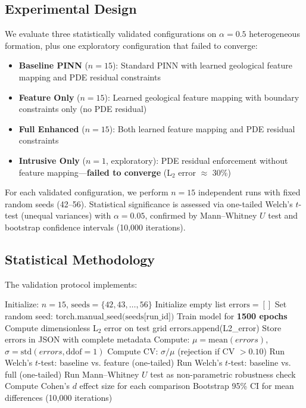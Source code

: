 \documentclass[sn-mathphys]{sn-jnl}
\begin{document}
	\subsection{Experimental Design}
	We evaluate three statistically validated configurations on $\alpha=0.5$ heterogeneous formation, plus one exploratory configuration that failed to converge:
	
	\begin{itemize}
		\item \textbf{Baseline PINN} ($n=15$): Standard PINN with learned geological feature mapping and PDE residual constraints
		\item \textbf{Feature Only} ($n=15$): Learned geological feature mapping with boundary constraints only (no PDE residual)
		\item \textbf{Full Enhanced} ($n=15$): Both learned feature mapping and PDE residual constraints
		\item \textbf{Intrusive Only} ($n=1$, exploratory): PDE residual enforcement without feature mapping---\textbf{failed to converge} (L$_2$ error $\approx$ 30\%)
	\end{itemize}
	
	For each validated configuration, we perform $n=15$ independent runs with fixed random seeds (42--56). Statistical significance is assessed via one-tailed Welch's $t$-test (unequal variances) with $\alpha=0.05$, confirmed by Mann--Whitney $U$ test and bootstrap confidence intervals (10,000 iterations).
	
	\subsection{Statistical Methodology}
	The validation protocol implements:
	
	\begin{algorithm}[htbp]
		\caption{Statistical Validation Protocol}
		\begin{algorithmic}[1]
			\State Initialize: $n=15$, $\text{seeds} = \{42, 43, \ldots, 56\}$
			  
			\State Initialize empty list $\text{errors} = []$
			\State Set random seed: $\text{torch.manual\_seed(seeds[run\_id])}$
			\State Train model for \textbf{1500 epochs}  
			\State Compute dimensionless L$_2$ error on test grid
			\State $\text{errors}$.append(L2\_error)
			\EndFor
			\State Store $\text{errors}$ in JSON with complete metadata
			\State Compute: $\mu = \text{mean}(errors)$, $\sigma = \text{std}(errors, \text{ddof}=1)$
			\State Compute CV: $\sigma/\mu$ (rejection if CV $> 0.10$)
			\EndFor
			\State Run Welch's $t$-test: baseline vs. feature (one-tailed)
			\State Run Welch's $t$-test: baseline vs. full (one-tailed)
			\State Run Mann--Whitney $U$ test as non-parametric robustness check
			\State Compute Cohen's $d$ effect size for each comparison
			\State Bootstrap 95\% CI for mean differences (10,000 iterations)
		\end{algorithmic}
	\end{algorithm}
	
\end{document}
